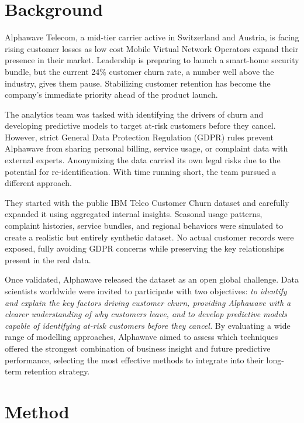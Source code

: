\documentclass[
]{article}
\begin{document}
\hypertarget{background}{%
\section{Background}\label{background}}

Alphawave Telecom, a mid-tier carrier active in Switzerland and Austria,
is facing rising customer losses as low cost Mobile Virtual Network
Operators expand their presence in their market. Leadership is preparing
to launch a smart-home security bundle, but the current 24\% customer
churn rate, a number well above the industry, gives them pause.
Stabilizing customer retention has become the company's immediate
priority ahead of the product launch.

The analytics team was tasked with identifying the drivers of churn and
developing predictive models to target at-risk customers before they
cancel. However, strict General Data Protection Regulation (GDPR) rules
prevent Alphawave from sharing personal billing, service usage, or
complaint data with external experts. Anonymizing the data carried its
own legal risks due to the potential for re-identification. With time
running short, the team pursued a different approach.

They started with the public IBM Telco Customer Churn dataset and
carefully expanded it using aggregated internal insights. Seasonal usage
patterns, complaint histories, service bundles, and regional behaviors
were simulated to create a realistic but entirely synthetic dataset. No
actual customer records were exposed, fully avoiding GDPR concerns while
preserving the key relationships present in the real data.

Once validated, Alphawave released the dataset as an open global
challenge. Data scientists worldwide were invited to participate with
two objectives: \emph{to identify and explain the key factors driving
customer churn, providing Alphawave with a clearer understanding of why
customers leave, and to develop predictive models capable of identifying
at-risk customers before they cancel.} By evaluating a wide range of
modelling approaches, Alphawave aimed to assess which techniques offered
the strongest combination of business insight and future predictive
performance, selecting the most effective methods to integrate into
their long-term retention strategy.

\hypertarget{method}{%
\section{Method}\label{method}}
\end{document}
